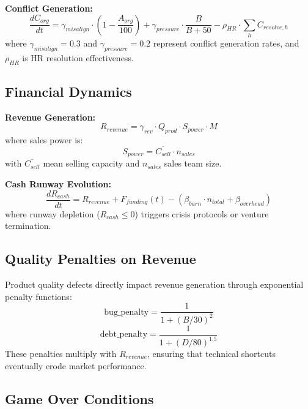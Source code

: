\documentclass[alpha-refs]{wiley-article}
\begin{document}
\textbf{Conflict Generation:}
\begin{equation}
\frac{dC_{org}}{dt} = \gamma_{misalign} \cdot \left(1 - \frac{A_{org}}{100}\right) + \gamma_{pressure} \cdot \frac{B}{B + 50} - \rho_{HR} \cdot \sum_h C_{resolve,h}
\end{equation}
where $\gamma_{misalign} = 0.3$ and $\gamma_{pressure} = 0.2$ represent conflict generation rates, and $\rho_{HR}$ is HR resolution effectiveness.

\subsection{Financial Dynamics}

\textbf{Revenue Generation:}
\begin{equation}
R_{revenue} = \gamma_{rev} \cdot Q_{prod} \cdot S_{power} \cdot M
\end{equation}
where sales power is:
\begin{equation}
S_{power} = \overline{C_{sell}} \cdot n_{sales}
\end{equation}
with $\overline{C_{sell}}$ mean selling capacity and $n_{sales}$ sales team size.

\textbf{Cash Runway Evolution:}
\begin{equation}
\frac{dR_{cash}}{dt} = R_{revenue} + F_{funding}(t) - (\beta_{burn} \cdot n_{total} + \beta_{overhead})
\end{equation}
where runway depletion ($R_{cash} \leq 0$) triggers crisis protocols or venture termination.

\subsection{Quality Penalties on Revenue}

Product quality defects directly impact revenue generation through exponential penalty functions:
\begin{equation}
\text{bug\_penalty} = \frac{1}{1 + (B/30)^2}
\end{equation}
\begin{equation}
\text{debt\_penalty} = \frac{1}{1 + (D/80)^{1.5}}
\end{equation}
These penalties multiply with $R_{revenue}$, ensuring that technical shortcuts eventually erode market performance.

\subsection{Game Over Conditions}
\end{document}
